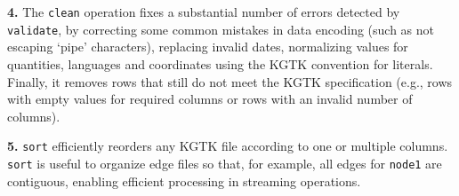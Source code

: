 \documentclass[runningheads]{llncs}
\newcommand{\kibitz}[2]{%
{\color{#1}#2}{}%
}
\newcommand{\pedro}[1]{\kibitz{orange}{[PS: #1]}} %
\newcommand{\DG}[1]{\kibitz{red}{[DG: #1]}} %
\begin{document}


\textbf{4.} The \texttt{clean} operation fixes a substantial number of errors detected by \texttt{validate}, by correcting some common mistakes in data encoding (such as not escaping `pipe' characters), %
replacing invalid dates, normalizing values for quantities, languages and coordinates using the KGTK convention for literals. Finally, it removes rows that still do not meet the KGTK specification (e.g., rows with empty values for required columns or rows with an invalid number of columns).


\textbf{5.}  \texttt{sort} efficiently reorders any KGTK file according to one or multiple columns. 
\texttt{sort} is useful to organize edge files so that, for example, all edges for \texttt{node1} are contiguous, enabling efficient processing in streaming operations.

\end{document}
